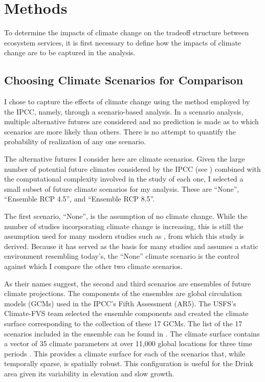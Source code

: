 \section{Methods}
To determine the impacts of climate change on the tradeoff structure between ecosystem services, it is first necessary to define how the impacts of climate change are to be captured in the analysis.
\subsection{Choosing Climate Scenarios for Comparison}
I chose to capture the effects of climate change using the method employed by the IPCC, namely, through a scenario-based analysis. In a scenario analysis, multiple alternative futures are considered and no prediction is made as to which scenarios are more likely than others. There is no attempt to quantify the probability of realization of any one scenario.

The alternative futures I consider here are climate scenarios. Given the large number of potential future climates considered by the IPCC (see \cite{ipccListOfAR5Models}) combined with the computational complexity involved in the study of each one, I selected a small subset of  future climate scenarios for my analysis. These are ``None'', ``Ensemble RCP 4.5'', and ``Ensemble RCP 8.5''.

The first scenario, ``None'', is the assumption of no climate change. While the number of studies incorporating climate change is increasing, this is still the assumption used for many modern studies such as \cite{svetlanaDissertation2013}, from which this study is derived. Because it has served as the basis for many studies and assumes a static environment resembling today's, the ``None'' climate scenario is the control against which I compare the other two climate scenarios.

As their names suggest, the second and third scenarios are ensembles of future climate projections. The components of the ensembles are global circulation models (GCMs) used in the IPCC's Fifth Assessment (AR5). The USFS's Climate-FVS \cite{dixon2002essential} team selected the ensemble components and created the climate surface corresponding to the collection of these 17 GCMs. The list of the 17 scenarios included in the ensemble can be found in \cite{ClimateModelsInFVSEnsemble}. The climate surface contains a vector of 35 climate parameters at over 11,000 global locations for three time periods \cite{crookston2014climate}. This provides a climate surface for each of the scenarios that, while temporally sparse, is spatially robust. This configuration is useful for the Drink area given its variability in elevation and slow growth.

